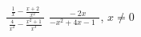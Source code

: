 {$\displaystyle \frac{\phantom{x} \frac{1}{x} - \frac{x+2}{x^2} \phantom{x}}{\frac{4}{x^2} - \frac{x^2+1}{x^3}}$}
{$\displaystyle \frac{\phantom{x} -2x}{-x^2+4x-1 \phantom{x} }$, $x \neq 0$}

